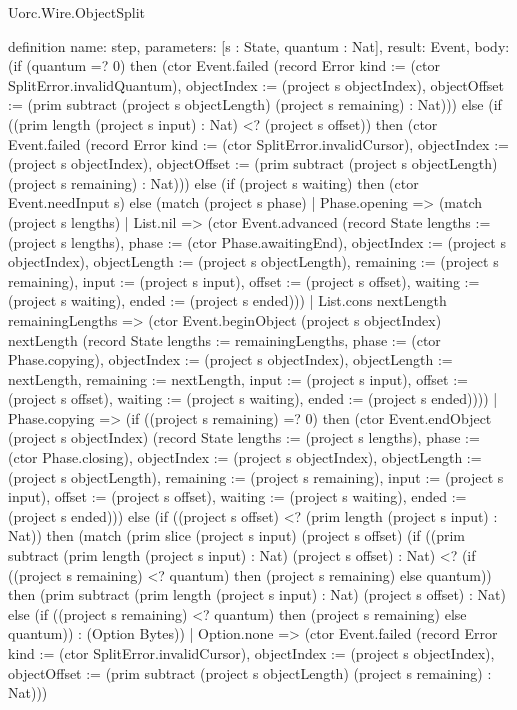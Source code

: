 \begin{lexlean}{Uorc.Wire.ObjectSplit}
\begin{semanticmodule}
definition{
  name: step,
  parameters: [s : State, quantum : Nat],
  result: Event,
  body: (if (quantum =? 0) then (ctor Event.failed (record Error {kind := (ctor SplitError.invalidQuantum), objectIndex := (project s objectIndex), objectOffset := (prim subtract (project s objectLength) (project s remaining) : Nat)})) else (if ((prim length (project s input) : Nat) <? (project s offset)) then (ctor Event.failed (record Error {kind := (ctor SplitError.invalidCursor), objectIndex := (project s objectIndex), objectOffset := (prim subtract (project s objectLength) (project s remaining) : Nat)})) else (if (project s waiting) then (ctor Event.needInput s) else (match (project s phase)
    | Phase.opening => (match (project s lengths)
      | List.nil => (ctor Event.advanced (record State {lengths := (project s lengths), phase := (ctor Phase.awaitingEnd), objectIndex := (project s objectIndex), objectLength := (project s objectLength), remaining := (project s remaining), input := (project s input), offset := (project s offset), waiting := (project s waiting), ended := (project s ended)}))
      | List.cons nextLength remainingLengths => (ctor Event.beginObject (project s objectIndex) nextLength (record State {lengths := remainingLengths, phase := (ctor Phase.copying), objectIndex := (project s objectIndex), objectLength := nextLength, remaining := nextLength, input := (project s input), offset := (project s offset), waiting := (project s waiting), ended := (project s ended)})))
    | Phase.copying => (if ((project s remaining) =? 0) then (ctor Event.endObject (project s objectIndex) (record State {lengths := (project s lengths), phase := (ctor Phase.closing), objectIndex := (project s objectIndex), objectLength := (project s objectLength), remaining := (project s remaining), input := (project s input), offset := (project s offset), waiting := (project s waiting), ended := (project s ended)})) else (if ((project s offset) <? (prim length (project s input) : Nat)) then (match (prim slice (project s input) (project s offset) (if ((prim subtract (prim length (project s input) : Nat) (project s offset) : Nat) <? (if ((project s remaining) <? quantum) then (project s remaining) else quantum)) then (prim subtract (prim length (project s input) : Nat) (project s offset) : Nat) else (if ((project s remaining) <? quantum) then (project s remaining) else quantum)) : (Option Bytes))
      | Option.none => (ctor Event.failed (record Error {kind := (ctor SplitError.invalidCursor), objectIndex := (project s objectIndex), objectOffset := (prim subtract (project s objectLength) (project s remaining) : Nat)}))
}
\end{semanticmodule}
\end{lexlean}
